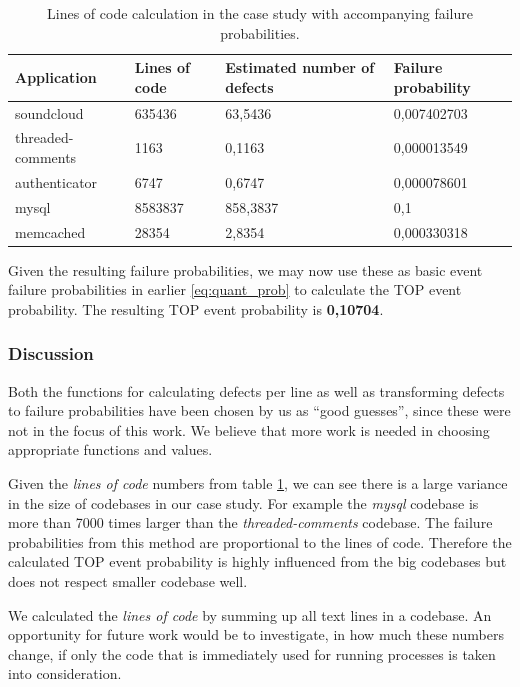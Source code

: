\begin{table}
  \label{tab:loc}
  \caption{Lines of code calculation in the case study with accompanying failure probabilities.}
  \begin{tabular}{ |l|l|l|l| }
    \hline
    Application & Lines of code & Estimated number of defects & Failure probability \\
    \hline
    soundcloud & 635436 & 63,5436 & 0,007402703 \\
    threaded-comments & 1163 & 0,1163 & 0,000013549 \\
    authenticator & 6747 & 0,6747 & 0,000078601 \\
    mysql & 8583837 & 858,3837 & 0,1 \\
    memcached & 28354 & 2,8354 & 0,000330318 \\
    \hline
  \end{tabular}
\end{table}

Given the resulting failure probabilities, we may now use these as basic event failure probabilities in earlier \autoref{eq:quant_prob} to calculate the TOP event probability. The resulting TOP event probability is \textbf{0,10704}.

\subsubsection{Discussion}

Both the functions for calculating defects per line as well as transforming defects to failure probabilities have been chosen by us as ``good guesses'', since these were not in the focus of this work. We believe that more work is needed in choosing appropriate functions and values.

Given the \emph{lines of code} numbers from table \ref{tab:loc}, we can see there is a large variance in the size of codebases in our case study. For example the \emph{mysql} codebase is more than 7000 times larger than the \emph{threaded-comments} codebase. The failure probabilities from this method are proportional to the lines of code. Therefore the calculated TOP event probability is highly influenced from the big codebases but does not respect smaller codebase well.

We calculated the \emph{lines of code} by summing up all text lines in a codebase. An opportunity for future work would be to investigate, in how much these numbers change, if only the code that is immediately used for running processes is taken into consideration.

